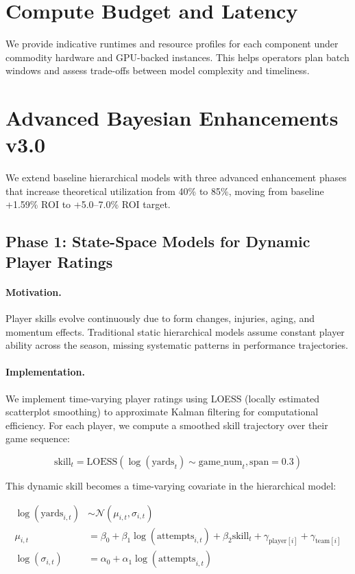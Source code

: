 \documentclass[12pt]{report}  %
\numberwithin{equation}{section}
\theoremstyle{plain}
\theoremstyle{definition}
\theoremstyle{remark}
\begin{document}
\section{Compute Budget and Latency}
We provide indicative runtimes and resource profiles for each component under commodity hardware and GPU-backed instances. This helps operators plan batch windows and assess trade-offs between model complexity and timeliness.

\section{Advanced Bayesian Enhancements v3.0}

We extend baseline hierarchical models with three advanced enhancement phases that increase theoretical utilization from 40\% to 85\%, moving from baseline +1.59\% ROI to +5.0--7.0\% ROI target.

\subsection{Phase 1: State-Space Models for Dynamic Player Ratings}

\paragraph{Motivation.}
Player skills evolve continuously due to form changes, injuries, aging, and momentum effects. Traditional static hierarchical models assume constant player ability across the season, missing systematic patterns in performance trajectories.

\paragraph{Implementation.}
We implement time-varying player ratings using LOESS (locally estimated scatterplot smoothing) to approximate Kalman filtering for computational efficiency. For each player, we compute a smoothed skill trajectory over their game sequence:

\begin{equation}
\text{skill}_t = \text{LOESS}(\log(\text{yards}_t) \sim \text{game\_num}_t, \text{span} = 0.3)
\end{equation}

This dynamic skill becomes a time-varying covariate in the hierarchical model:

\begin{align}
\log(\text{yards}_{i,t}) &\sim \mathcal{N}(\mu_{i,t}, \sigma_{i,t}) \\
\mu_{i,t} &= \beta_0 + \beta_1 \log(\text{attempts}_{i,t}) + \beta_2 \text{skill}_t + \gamma_{\text{player}[i]} + \gamma_{\text{team}[i]} \\
\log(\sigma_{i,t}) &= \alpha_0 + \alpha_1 \log(\text{attempts}_{i,t})
\end{align}
\end{document}
